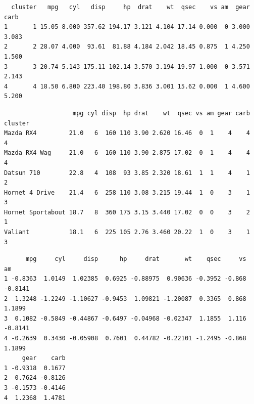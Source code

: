 \documentclass[12pt,brazil,oneside]{book}
\newenvironment{Shaded}{\begin{snugshade}}{\end{snugshade}}
\newcommand{\DataTypeTok}[1]{\textcolor[rgb]{0.13,0.29,0.53}{#1}}
\newcommand{\KeywordTok}[1]{\textcolor[rgb]{0.13,0.29,0.53}{\textbf{#1}}}
\newcommand{\NormalTok}[1]{#1}
\newcommand{\OperatorTok}[1]{\textcolor[rgb]{0.81,0.36,0.00}{\textbf{#1}}}
\begin{document}
\begin{verbatim}
  cluster   mpg   cyl   disp     hp  drat    wt  qsec    vs am  gear  carb
1       1 15.05 8.000 357.62 194.17 3.121 4.104 17.14 0.000  0 3.000 3.083
2       2 28.07 4.000  93.61  81.88 4.184 2.042 18.45 0.875  1 4.250 1.500
3       3 20.74 5.143 175.11 102.14 3.570 3.194 19.97 1.000  0 3.571 2.143
4       4 18.50 6.800 223.40 198.80 3.836 3.001 15.62 0.000  1 4.600 5.200
\end{verbatim}

\begin{Shaded}
\end{Shaded}

\begin{verbatim}
                   mpg cyl disp  hp drat    wt  qsec vs am gear carb cluster
Mazda RX4         21.0   6  160 110 3.90 2.620 16.46  0  1    4    4       4
Mazda RX4 Wag     21.0   6  160 110 3.90 2.875 17.02  0  1    4    4       4
Datsun 710        22.8   4  108  93 3.85 2.320 18.61  1  1    4    1       2
Hornet 4 Drive    21.4   6  258 110 3.08 3.215 19.44  1  0    3    1       3
Hornet Sportabout 18.7   8  360 175 3.15 3.440 17.02  0  0    3    2       1
Valiant           18.1   6  225 105 2.76 3.460 20.22  1  0    3    1       3
\end{verbatim}

\begin{Shaded}
\end{Shaded}

\begin{verbatim}
      mpg     cyl     disp      hp     drat       wt    qsec     vs      am
1 -0.8363  1.0149  1.02385  0.6925 -0.88975  0.90636 -0.3952 -0.868 -0.8141
2  1.3248 -1.2249 -1.10627 -0.9453  1.09821 -1.20087  0.3365  0.868  1.1899
3  0.1082 -0.5849 -0.44867 -0.6497 -0.04968 -0.02347  1.1855  1.116 -0.8141
4 -0.2639  0.3430 -0.05908  0.7601  0.44782 -0.22101 -1.2495 -0.868  1.1899
     gear    carb
1 -0.9318  0.1677
2  0.7624 -0.8126
3 -0.1573 -0.4146
4  1.2368  1.4781
\end{verbatim}
\end{document}
